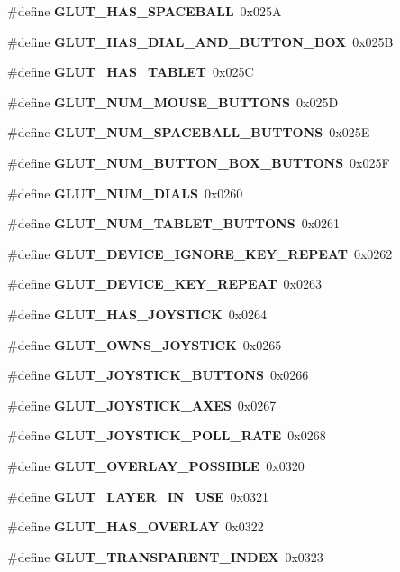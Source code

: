 \begin{DoxyCompactItemize}
\item 
\#define {\bf G\+L\+U\+T\+\_\+\+H\+A\+S\+\_\+\+S\+P\+A\+C\+E\+B\+A\+L\+L}~0x025\+A
\item 
\#define {\bf G\+L\+U\+T\+\_\+\+H\+A\+S\+\_\+\+D\+I\+A\+L\+\_\+\+A\+N\+D\+\_\+\+B\+U\+T\+T\+O\+N\+\_\+\+B\+O\+X}~0x025\+B
\item 
\#define {\bf G\+L\+U\+T\+\_\+\+H\+A\+S\+\_\+\+T\+A\+B\+L\+E\+T}~0x025\+C
\item 
\#define {\bf G\+L\+U\+T\+\_\+\+N\+U\+M\+\_\+\+M\+O\+U\+S\+E\+\_\+\+B\+U\+T\+T\+O\+N\+S}~0x025\+D
\item 
\#define {\bf G\+L\+U\+T\+\_\+\+N\+U\+M\+\_\+\+S\+P\+A\+C\+E\+B\+A\+L\+L\+\_\+\+B\+U\+T\+T\+O\+N\+S}~0x025\+E
\item 
\#define {\bf G\+L\+U\+T\+\_\+\+N\+U\+M\+\_\+\+B\+U\+T\+T\+O\+N\+\_\+\+B\+O\+X\+\_\+\+B\+U\+T\+T\+O\+N\+S}~0x025\+F
\item 
\#define {\bf G\+L\+U\+T\+\_\+\+N\+U\+M\+\_\+\+D\+I\+A\+L\+S}~0x0260
\item 
\#define {\bf G\+L\+U\+T\+\_\+\+N\+U\+M\+\_\+\+T\+A\+B\+L\+E\+T\+\_\+\+B\+U\+T\+T\+O\+N\+S}~0x0261
\item 
\#define {\bf G\+L\+U\+T\+\_\+\+D\+E\+V\+I\+C\+E\+\_\+\+I\+G\+N\+O\+R\+E\+\_\+\+K\+E\+Y\+\_\+\+R\+E\+P\+E\+A\+T}~0x0262
\item 
\#define {\bf G\+L\+U\+T\+\_\+\+D\+E\+V\+I\+C\+E\+\_\+\+K\+E\+Y\+\_\+\+R\+E\+P\+E\+A\+T}~0x0263
\item 
\#define {\bf G\+L\+U\+T\+\_\+\+H\+A\+S\+\_\+\+J\+O\+Y\+S\+T\+I\+C\+K}~0x0264
\item 
\#define {\bf G\+L\+U\+T\+\_\+\+O\+W\+N\+S\+\_\+\+J\+O\+Y\+S\+T\+I\+C\+K}~0x0265
\item 
\#define {\bf G\+L\+U\+T\+\_\+\+J\+O\+Y\+S\+T\+I\+C\+K\+\_\+\+B\+U\+T\+T\+O\+N\+S}~0x0266
\item 
\#define {\bf G\+L\+U\+T\+\_\+\+J\+O\+Y\+S\+T\+I\+C\+K\+\_\+\+A\+X\+E\+S}~0x0267
\item 
\#define {\bf G\+L\+U\+T\+\_\+\+J\+O\+Y\+S\+T\+I\+C\+K\+\_\+\+P\+O\+L\+L\+\_\+\+R\+A\+T\+E}~0x0268
\item 
\#define {\bf G\+L\+U\+T\+\_\+\+O\+V\+E\+R\+L\+A\+Y\+\_\+\+P\+O\+S\+S\+I\+B\+L\+E}~0x0320
\item 
\#define {\bf G\+L\+U\+T\+\_\+\+L\+A\+Y\+E\+R\+\_\+\+I\+N\+\_\+\+U\+S\+E}~0x0321
\item 
\#define {\bf G\+L\+U\+T\+\_\+\+H\+A\+S\+\_\+\+O\+V\+E\+R\+L\+A\+Y}~0x0322
\item 
\#define {\bf G\+L\+U\+T\+\_\+\+T\+R\+A\+N\+S\+P\+A\+R\+E\+N\+T\+\_\+\+I\+N\+D\+E\+X}~0x0323

\end{DoxyCompactItemize}
